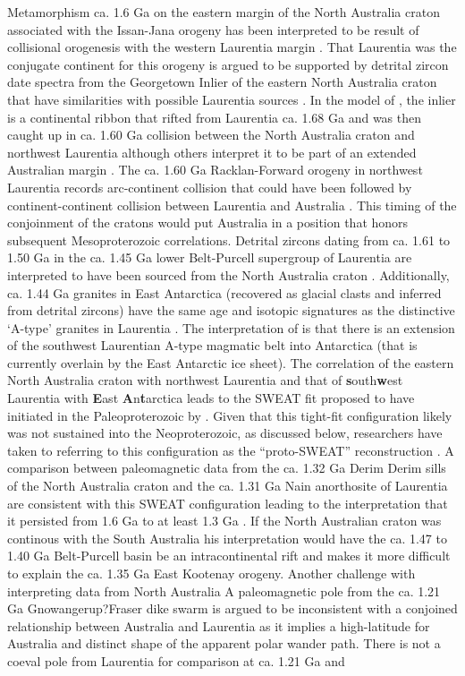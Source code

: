 \documentclass[twocolumn, switch]{article} %
\begin{document}
Metamorphism ca. 1.6 Ga on the eastern margin of the North Australia craton associated with the Issan-Jana orogeny has been interpreted to  be result of collisional orogenesis with the western Laurentia margin \citep{Nordsvan2018a, Pourteau2018a, Gibson2020a}. That Laurentia was the conjugate continent for this orogeny is argued to be supported by detrital zircon date spectra from the Georgetown Inlier of the eastern North Australia craton that have similarities with possible Laurentia sources \citep{Nordsvan2018a}. In the model of \cite{Nordsvan2018a}, the inlier is a continental ribbon that rifted from Laurentia ca. 1.68 Ga and was then caught up in ca. 1.60 Ga collision between the North Australia craton and northwest Laurentia although others interpret it to be part of an extended Australian margin \citep{Gibson2020a}. The ca. 1.60 Ga Racklan-Forward orogeny in northwest Laurentia records arc-continent collision that could have been followed by continent-continent collision between Laurentia and Australia \citep{Thorkelson2005a, Furlanetto2013a}. This timing of the conjoinment of the cratons would put Australia in a position that honors subsequent Mesoproterozoic correlations. Detrital zircons dating from ca. 1.61 to 1.50 Ga in the ca. 1.45 Ga lower Belt-Purcell supergroup of Laurentia are interpreted to have been sourced from the North Australia craton \citep{Jones2015a}. Additionally, ca. 1.44 Ga granites in East Antarctica (recovered as glacial clasts and inferred from detrital zircons) have the same age and isotopic signatures as the distinctive `A-type' granites in Laurentia \citep{Goodge2008a}. The interpretation of \cite{Goodge2008a, Goodge2017a} is that there is an extension of the southwest Laurentian A-type magmatic belt into Antarctica (that is currently overlain by the East Antarctic ice sheet). The correlation of the eastern North Australia craton with northwest Laurentia and that of \textbf{s}outh\textbf{w}est Laurentia with \textbf{E}ast \textbf{A}n\textbf{t}arctica leads to the SWEAT fit proposed to have initiated in the Paleoproterozoic by \cite{Moores1991a}. Given that this tight-fit configuration likely was not sustained into the Neoproterozoic, as discussed below, researchers have taken to referring to this configuration as  the ``proto-SWEAT'' reconstruction \citep{Payne2009b, Kirscher2020a}. A comparison between paleomagnetic data from the ca. 1.32 Ga Derim Derim sills of the North Australia craton and the ca. 1.31 Ga Nain anorthosite of Laurentia are consistent with this SWEAT configuration leading to the interpretation that it persisted from 1.6 Ga to at least 1.3 Ga \citep{Kirscher2020a}. If the North Australian craton was continous with the South Australia his interpretation would have the ca. 1.47 to 1.40 Ga Belt-Purcell basin be an intracontinental rift and makes it more difficult to explain the ca. 1.35 Ga East Kootenay orogeny. Another challenge with interpreting data from North Australia A paleomagnetic pole from the ca. 1.21 Ga Gnowangerup?Fraser dike swarm is argued to be inconsistent with a conjoined relationship between Australia and Laurentia as it implies a high-latitude for Australia and distinct shape of the apparent polar wander path\citep{Pisarevsky2014a}. There is not a coeval pole from Laurentia for comparison at ca. 1.21 Ga and 
\end{document}
